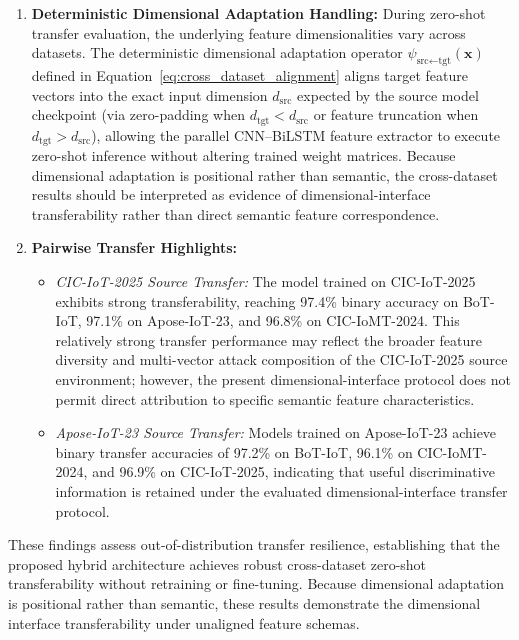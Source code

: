 \documentclass[a4paper,fleqn]{cas-sc}
\begin{document}
\begin{enumerate}
    \item \textbf{Deterministic Dimensional Adaptation Handling:}
    During zero-shot transfer evaluation, the underlying feature dimensionalities vary across datasets. The deterministic dimensional adaptation operator $\psi_{\text{src} \leftarrow \text{tgt}}(\mathbf{x})$ defined in Equation~\ref{eq:cross_dataset_alignment} aligns target feature vectors into the exact input dimension $d_{\text{src}}$ expected by the source model checkpoint (via zero-padding when $d_{\text{tgt}} < d_{\text{src}}$ or feature truncation when $d_{\text{tgt}} > d_{\text{src}}$), allowing the parallel CNN--BiLSTM feature extractor to execute zero-shot inference without altering trained weight matrices. Because dimensional adaptation is positional rather than semantic, the cross-dataset results should be interpreted as evidence of dimensional-interface transferability rather than direct semantic feature correspondence.

    \item \textbf{Pairwise Transfer Highlights:}
    \begin{itemize}
        \item \textit{CIC-IoT-2025 Source Transfer:} The model trained on CIC-IoT-2025 exhibits strong transferability, reaching 97.4\% binary accuracy on BoT-IoT, 97.1\% on Apose-IoT-23, and 96.8\% on CIC-IoMT-2024. {\color{blue}This relatively strong transfer performance may reflect the broader feature diversity and multi-vector attack composition of the CIC-IoT-2025 source environment; however, the present dimensional-interface protocol does not permit direct attribution to specific semantic feature characteristics.}
        \item \textit{Apose-IoT-23 Source Transfer:} Models trained on Apose-IoT-23 achieve binary transfer accuracies of 97.2\% on BoT-IoT, 96.1\% on CIC-IoMT-2024, and 96.9\% on CIC-IoT-2025, {\color{blue}indicating that useful discriminative information is retained under the evaluated dimensional-interface transfer protocol.}
    \end{itemize}
\end{enumerate}

{\color{blue}These findings assess out-of-distribution transfer resilience, establishing that the proposed hybrid architecture achieves robust cross-dataset zero-shot transferability without retraining or fine-tuning. Because dimensional adaptation is positional rather than semantic, these results demonstrate the dimensional interface transferability under unaligned feature schemas.}
\end{document}
